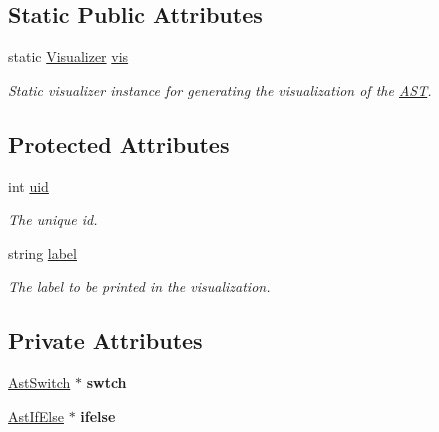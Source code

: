 \subsection*{Static Public Attributes}
\begin{DoxyCompactItemize}
\item 
\hypertarget{classAST_aca9e6637209b31e03a09c0d42f29bdfa}{static \hyperlink{classVisualizer}{Visualizer} \hyperlink{classAST_aca9e6637209b31e03a09c0d42f29bdfa}{vis}}\label{classAST_aca9e6637209b31e03a09c0d42f29bdfa}

\begin{DoxyCompactList}\small\item\em Static visualizer instance for generating the visualization of the \hyperlink{classAST}{A\-S\-T}. \end{DoxyCompactList}\end{DoxyCompactItemize}
\subsection*{Protected Attributes}
\begin{DoxyCompactItemize}
\item 
\hypertarget{classAST_a847b778f1c3dd5a19de32de432ee6e15}{int \hyperlink{classAST_a847b778f1c3dd5a19de32de432ee6e15}{uid}}\label{classAST_a847b778f1c3dd5a19de32de432ee6e15}

\begin{DoxyCompactList}\small\item\em The unique id. \end{DoxyCompactList}\item 
\hypertarget{classAST_ab2e239ccc0688d2341724432ff5a1a31}{string \hyperlink{classAST_ab2e239ccc0688d2341724432ff5a1a31}{label}}\label{classAST_ab2e239ccc0688d2341724432ff5a1a31}

\begin{DoxyCompactList}\small\item\em The label to be printed in the visualization. \end{DoxyCompactList}\end{DoxyCompactItemize}
\subsection*{Private Attributes}
\begin{DoxyCompactItemize}
\item 
\hypertarget{classAstSelection_a8addff87b6cee0d4e2ea69f68747269c}{\hyperlink{classAstSwitch}{Ast\-Switch} $\ast$ {\bfseries swtch}}\label{classAstSelection_a8addff87b6cee0d4e2ea69f68747269c}

\item 
\hypertarget{classAstSelection_a54be34f8f99d53fd3d04a3f7b545f039}{\hyperlink{classAstIfElse}{Ast\-If\-Else} $\ast$ {\bfseries ifelse}}\label{classAstSelection_a54be34f8f99d53fd3d04a3f7b545f039}

\end{DoxyCompactItemize}


